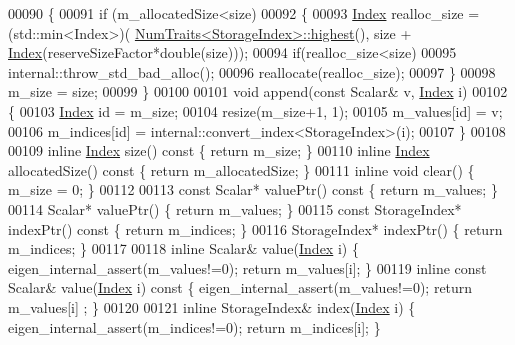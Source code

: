 \begin{DoxyCode}
00090     \{
00091       \textcolor{keywordflow}{if} (m\_allocatedSize<size)
00092       \{
00093         \hyperlink{namespace_eigen_a62e77e0933482dafde8fe197d9a2cfde}{Index} realloc\_size = (std::min<Index>)(
      \hyperlink{group___core___module_struct_eigen_1_1_num_traits}{NumTraits<StorageIndex>::highest}(),  size + 
      \hyperlink{namespace_eigen_a62e77e0933482dafde8fe197d9a2cfde}{Index}(reserveSizeFactor*\textcolor{keywordtype}{double}(size)));
00094         \textcolor{keywordflow}{if}(realloc\_size<size)
00095           internal::throw\_std\_bad\_alloc();
00096         reallocate(realloc\_size);
00097       \}
00098       m\_size = size;
00099     \}
00100 
00101     \textcolor{keywordtype}{void} append(\textcolor{keyword}{const} Scalar& v, \hyperlink{namespace_eigen_a62e77e0933482dafde8fe197d9a2cfde}{Index} i)
00102     \{
00103       \hyperlink{namespace_eigen_a62e77e0933482dafde8fe197d9a2cfde}{Index} \textcolor{keywordtype}{id} = m\_size;
00104       resize(m\_size+1, 1);
00105       m\_values[id] = v;
00106       m\_indices[id] = internal::convert\_index<StorageIndex>(i);
00107     \}
00108 
00109     \textcolor{keyword}{inline} \hyperlink{namespace_eigen_a62e77e0933482dafde8fe197d9a2cfde}{Index} size()\textcolor{keyword}{ const }\{ \textcolor{keywordflow}{return} m\_size; \}
00110     \textcolor{keyword}{inline} \hyperlink{namespace_eigen_a62e77e0933482dafde8fe197d9a2cfde}{Index} allocatedSize()\textcolor{keyword}{ const }\{ \textcolor{keywordflow}{return} m\_allocatedSize; \}
00111     \textcolor{keyword}{inline} \textcolor{keywordtype}{void} clear() \{ m\_size = 0; \}
00112 
00113     \textcolor{keyword}{const} Scalar* valuePtr()\textcolor{keyword}{ const }\{ \textcolor{keywordflow}{return} m\_values; \}
00114     Scalar* valuePtr() \{ \textcolor{keywordflow}{return} m\_values; \}
00115     \textcolor{keyword}{const} StorageIndex* indexPtr()\textcolor{keyword}{ const }\{ \textcolor{keywordflow}{return} m\_indices; \}
00116     StorageIndex* indexPtr() \{ \textcolor{keywordflow}{return} m\_indices; \}
00117 
00118     \textcolor{keyword}{inline} Scalar& value(\hyperlink{namespace_eigen_a62e77e0933482dafde8fe197d9a2cfde}{Index} i) \{ eigen\_internal\_assert(m\_values!=0); \textcolor{keywordflow}{return} m\_values[i]; \}
00119     \textcolor{keyword}{inline} \textcolor{keyword}{const} Scalar& value(\hyperlink{namespace_eigen_a62e77e0933482dafde8fe197d9a2cfde}{Index} i)\textcolor{keyword}{ const }\{ eigen\_internal\_assert(m\_values!=0); \textcolor{keywordflow}{return} m\_values[i]
      ; \}
00120 
00121     \textcolor{keyword}{inline} StorageIndex& index(\hyperlink{namespace_eigen_a62e77e0933482dafde8fe197d9a2cfde}{Index} i) \{ eigen\_internal\_assert(m\_indices!=0); \textcolor{keywordflow}{return} m\_indices[i]; \}

\end{DoxyCode}
